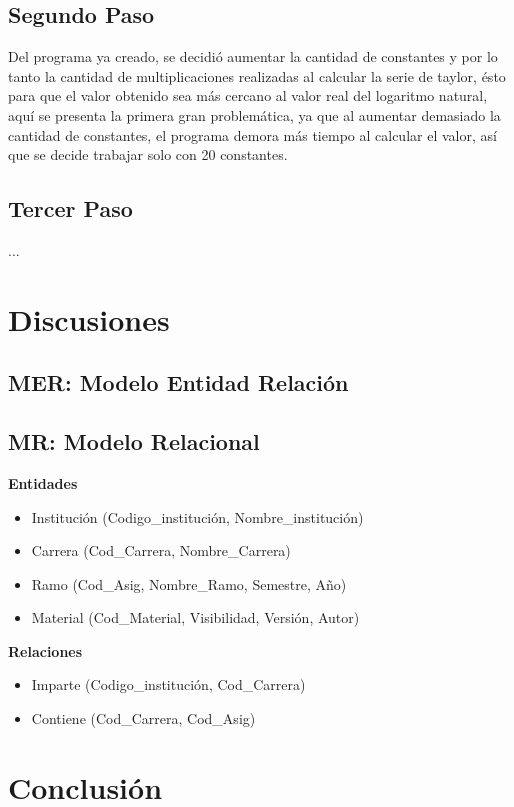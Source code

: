 \documentclass[12pt,letterpaper]{article}
\begin{document}
\subsection{Segundo Paso}
Del programa ya creado, se decidió aumentar la cantidad de constantes y por lo tanto la cantidad de multiplicaciones realizadas al calcular la serie de taylor, ésto para que el valor obtenido sea más cercano al valor real del logaritmo natural, aquí se presenta la primera gran problemática, ya que al aumentar demasiado la cantidad de constantes, el programa demora más tiempo al calcular el valor, así que se decide trabajar solo con 20 constantes.

\subsection{Tercer Paso}
...
\newpage
\section{Discusiones}
\subsection{MER: Modelo Entidad Relación}

\subsection{MR: Modelo Relacional}
\textbf{Entidades}

\begin{itemize}
\item Institución (Codigo\_institución, Nombre\_institución)
\item Carrera (Cod\_Carrera, Nombre\_Carrera)
\item Ramo (Cod\_Asig, Nombre\_Ramo, Semestre, Año)
\item Material (Cod\_Material, Visibilidad, Versión, Autor)
\end{itemize}

\textbf{Relaciones}
\begin{itemize}
\item Imparte (Codigo\_institución, Cod\_Carrera)
\item Contiene (Cod\_Carrera, Cod\_Asig)
\end{itemize}

\newpage
\section{Conclusión}
\lipsum[1-3]

\newpage
{}


\end{document}
